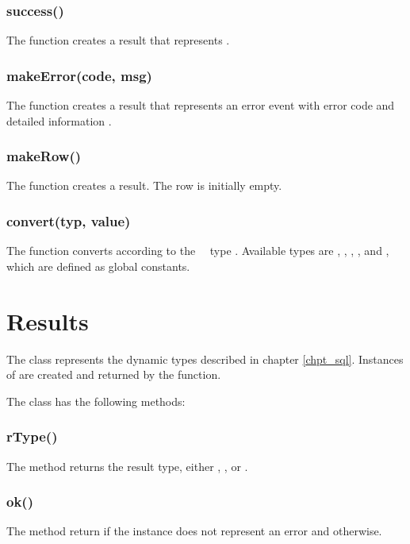 \subsubsection{success()}
The function creates a  result
that represents .

\subsubsection{makeError(code, msg)}
The function creates a  result
that represents an error event with error code
 and detailed information .

\subsubsection{makeRow()}
The function creates a  result.
The row is initially empty.

\subsubsection{convert(typ, value)}
The function converts  according
to the \nowdb\ \sql\ type .
Available types are
, ,
, ,  and
,
which are defined as global constants.

\section{Results}
The  class represents
the dynamic types described in chapter \ref{chpt_sql}.
Instances of  are
created and returned by
the  function.

The  class has the following methods:

\subsubsection{rType()}
The method returns the result type,
either ,
,  or .

\subsubsection{ok()}
The method return 
if the instance does not represent
an error and  otherwise.

